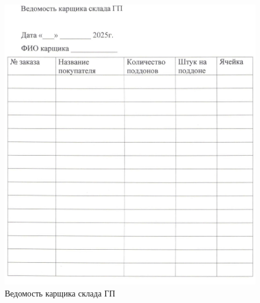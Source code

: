 \begin{figure}
\begin{center}
\includegraphics[height=0.94\textheight, width=\textwidth, keepaspectratio]{Pics/f7.jpg}
\end{center}
\caption{Ведомость карщика склада ГП}
\label{pic:f7}
\end{figure}

